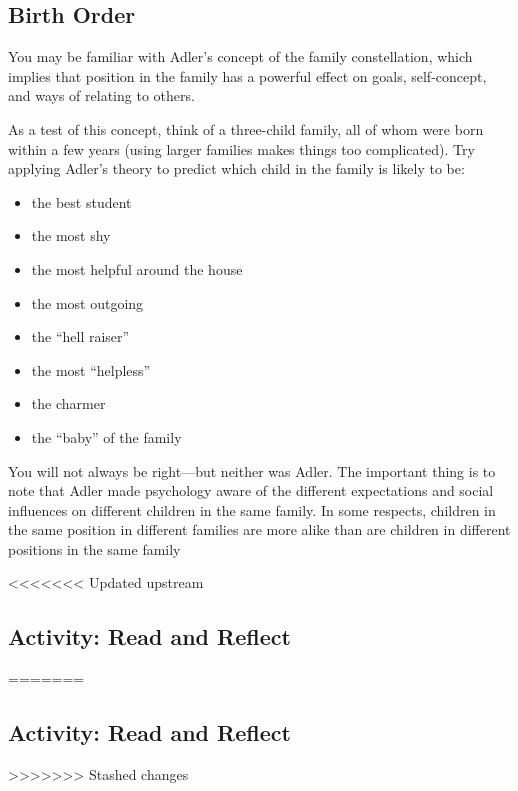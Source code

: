 \documentclass[
]{book}
\providecommand{\tightlist}{%
  \setlength{\itemsep}{0pt}\setlength{\parskip}{0pt}}
\begin{document}
\hypertarget{birth-order}{%
\subsection*{Birth Order}\label{birth-order}}

You may be familiar with Adler's concept of the family constellation, which implies that position in the family has a powerful effect on goals, self-concept, and ways of relating to others.

As a test of this concept, think of a three-child family, all of whom were born within a few years (using larger families makes things too complicated). Try applying Adler's theory to predict which child in the family is likely to be:

\begin{itemize}
\tightlist
\item
  the best student\\
\item
  the most shy\\
\item
  the most helpful around the house\\
\item
  the most outgoing\\
\item
  the ``hell raiser''\\
\item
  the most ``helpless''\\
\item
  the charmer\\
\item
  the ``baby'' of the family
\end{itemize}

You will not always be right---but neither was Adler. The important thing is to note that Adler made psychology aware of the different expectations and social influences on different children in the same family. In some respects, children in the same position in different families are more alike than are children in differ­ent positions in the same family

<<<<<<< Updated upstream
\hypertarget{activity-read-and-reflect-2}{%
\subsection*{Activity: Read and Reflect}\label{activity-read-and-reflect-2}}
=======
\hypertarget{activity-read-and-reflect-1}{%
\subsection*{Activity: Read and Reflect}\label{activity-read-and-reflect-1}}
>>>>>>> Stashed changes
\end{document}
